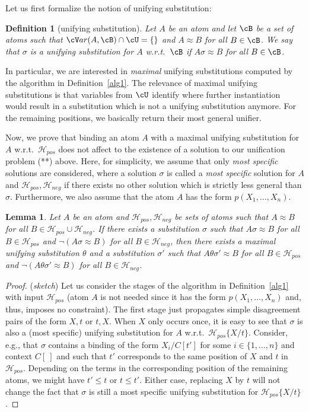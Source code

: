 \documentclass[fleqn]{tlp}
\newtheorem{definition}{Definition} \newtheorem{example}{Example} \newtheorem{lemma}{Lemma} \newtheorem{proposition}{Proposition} \newtheorem{theorem}{Theorem} \newtheorem{corollary}{Corollary}
\newcommand{\var}{{\cV}ar}
\newcommand{\Hpos}{\mathcal{H}_{\mathit{pos}}}
\newcommand{\Hneg}{\mathcal{H}_{\mathit{neg}}}
\begin{document}
\begin{appendix}
Let us first formalize the notion of unifying substitution:

\begin{definition}[unifying substitution]
  Let $A$ be an atom and let $\cB$ be a set of atoms such that
  $\var(A,\cB)\cap\cU=\emptyset$ and $A\approx B$ for all
  $B\in\cB$. We say that $\sigma$ is a unifying substitution for $A$
  w.r.t.\ $\cB$ if $A\sigma\approx B$ for all $B\in\cB$.
\end{definition}
In particular, we are interested in \emph{maximal} unifying
substitutions computed by the algorithm in Definition~\ref{alg1}.
The relevance of maximal unifying substitutions is that variables from
$\cU$ identify where further instantiation would result in a
substitution which is not a unifying substitution anymore.
For the remaining positions, we basically return their most general
unifier.

Now, we prove that binding an atom $A$ with a maximal unifying
substitution for $A$ w.r.t.\ $\Hpos$ does not affect to the existence
of a solution to our unification problem (**) above.
Here, for simplicity, we assume that only \emph{most specific}
solutions are considered, where a solution $\sigma$ is called a
\emph{most specific} solution for $A$ and $\Hpos,\Hneg$ if there
exists no other solution which is strictly less general than $\sigma$.
Furthermore, we also assume that the atom $A$ has the form
$p(X_1,\ldots,X_n)$.

\begin{lemma}
  Let $A$ be an atom and $\Hpos,\Hneg$ be sets of atoms such that
  $A\approx B$ for all $B\in\Hpos\cup\Hneg$. If there exists a
  substitution $\sigma$ such that $A\sigma\approx B$ for all
  $B\in\Hpos$ and $\neg(A\sigma\approx B)$ for all $B\in\Hneg$, then
  there exists a maximal unifying substitution $\theta$ and a
  substitution $\sigma'$ such that $A\theta\sigma'\approx B$ for all
  $B\in\Hpos$ and $\neg(A\theta\sigma'\approx B)$ for all $B\in\Hneg$.
\end{lemma}

\begin{proof} (\emph{sketch})
  Let us consider the stages of the algorithm in Definition~\ref{alg1}
  with input $\Hpos$ (atom $A$ is not needed since it has the form
  $p(X_1,\ldots,X_n)$ and, thus, imposes no constraint).  The first
  stage just propagates simple disagreement pairs of the form $X,t$ or
  $t,X$. When $X$ only occurs once, it is easy to see that $\sigma$ is
  also a (most specific) unifying substitution for $A$ w.r.t.\
  $\Hpos\{X/t\}$. Consider, e.g., that $\sigma$ contains a binding of
  the form $X_i/C[t']$ for some $i\in\{1,\ldots,n\}$ and context
  $C[~]$ and such that $t'$ corresponds to the same position of $X$
  and $t$ in $\Hpos$. Depending on the terms in the corresponding
  position of the remaining atoms, we might have $t'\leq t$ or $t\leq
  t'$. Either case, replacing $X$ by $t$ will not change the fact that
  $\sigma$ is still a most specific unifying substitution for
  $\Hpos\{X/t\}$.


\end{proof}
\end{appendix}
\end{document}
